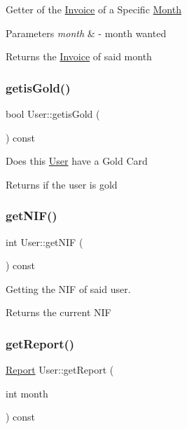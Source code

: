 Getter of the \mbox{\hyperlink{class_invoice}{Invoice}} of a Specific \mbox{\hyperlink{class_month}{Month}} 
\begin{DoxyParams}{Parameters}
{\em month} & -\/ month wanted \\
\hline
\end{DoxyParams}
\begin{DoxyReturn}{Returns}
the \mbox{\hyperlink{class_invoice}{Invoice}} of said month 
\end{DoxyReturn}
\mbox{\label{class_user_abd33fb93abc0209808bab9ffc6c2482c}} 
\subsubsection{\texorpdfstring{getis\+Gold()}{getisGold()}}
{\footnotesize\ttfamily bool User\+::getis\+Gold (\begin{DoxyParamCaption}{ }\end{DoxyParamCaption}) const}

Does this \mbox{\hyperlink{class_user}{User}} have a Gold Card \begin{DoxyReturn}{Returns}
if the user is gold 
\end{DoxyReturn}
\mbox{\label{class_user_a5e98c1820005dd6915bccd75bd573cea}} 
\subsubsection{\texorpdfstring{get\+N\+I\+F()}{getNIF()}}
{\footnotesize\ttfamily int User\+::get\+N\+IF (\begin{DoxyParamCaption}{ }\end{DoxyParamCaption}) const}



Getting the N\+IF of said user. 

\begin{DoxyReturn}{Returns}
the current N\+IF 
\end{DoxyReturn}
\mbox{\label{class_user_a655a16e4a6e044d973b54073cdb4bc96}} 
\subsubsection{\texorpdfstring{get\+Report()}{getReport()}}
{\footnotesize\ttfamily \mbox{\hyperlink{class_report}{Report}} User\+::get\+Report (\begin{DoxyParamCaption}\item[{int}]{month }\end{DoxyParamCaption}) const}

